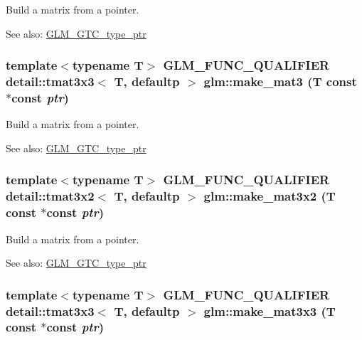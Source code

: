 Build a matrix from a pointer. \begin{Desc}
\item[See also:]\hyperlink{group__gtc__type__ptr}{GLM\_\-GTC\_\-type\_\-ptr} \end{Desc}
\hypertarget{group__gtc__type__ptr_g63c04b2cd2367a06e9817a66b5025662}{
\subsubsection[make\_\-mat3]{\setlength{\rightskip}{0pt plus 5cm}template$<$typename T$>$ GLM\_\-FUNC\_\-QUALIFIER detail::tmat3x3$<$ T, defaultp $>$ glm::make\_\-mat3 (T const $\ast$const  {\em ptr})}}
\label{group__gtc__type__ptr_g63c04b2cd2367a06e9817a66b5025662}


Build a matrix from a pointer. \begin{Desc}
\item[See also:]\hyperlink{group__gtc__type__ptr}{GLM\_\-GTC\_\-type\_\-ptr} \end{Desc}
\hypertarget{group__gtc__type__ptr_g6c7d94e71f8df512fca44427311baeae}{
\subsubsection[make\_\-mat3x2]{\setlength{\rightskip}{0pt plus 5cm}template$<$typename T$>$ GLM\_\-FUNC\_\-QUALIFIER detail::tmat3x2$<$ T, defaultp $>$ glm::make\_\-mat3x2 (T const $\ast$const  {\em ptr})}}
\label{group__gtc__type__ptr_g6c7d94e71f8df512fca44427311baeae}


Build a matrix from a pointer. \begin{Desc}
\item[See also:]\hyperlink{group__gtc__type__ptr}{GLM\_\-GTC\_\-type\_\-ptr} \end{Desc}
\hypertarget{group__gtc__type__ptr_g206b172296286d333b0ff92e77b28b66}{
\subsubsection[make\_\-mat3x3]{\setlength{\rightskip}{0pt plus 5cm}template$<$typename T$>$ GLM\_\-FUNC\_\-QUALIFIER detail::tmat3x3$<$ T, defaultp $>$ glm::make\_\-mat3x3 (T const $\ast$const  {\em ptr})}}
\label{group__gtc__type__ptr_g206b172296286d333b0ff92e77b28b66}


